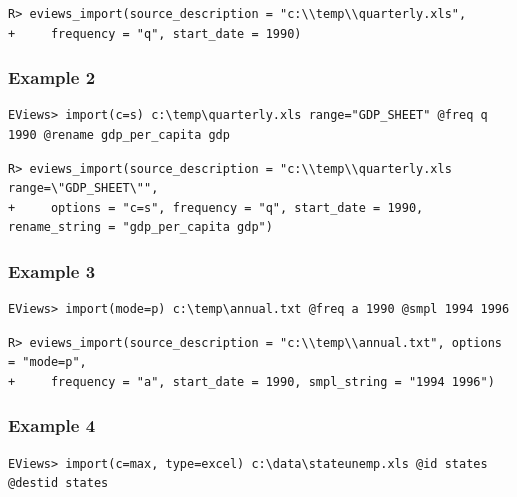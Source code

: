 \begin{verbatim}
R> eviews_import(source_description = "c:\\temp\\quarterly.xls",
+     frequency = "q", start_date = 1990)
\end{verbatim}

\hypertarget{example-2-1}{%
\subsubsection{Example 2}\label{example-2-1}}

\begin{verbatim}
EViews> import(c=s) c:\temp\quarterly.xls range="GDP_SHEET" @freq q 1990 @rename gdp_per_capita gdp
\end{verbatim}

\begin{verbatim}
R> eviews_import(source_description = "c:\\temp\\quarterly.xls range=\"GDP_SHEET\"",
+     options = "c=s", frequency = "q", start_date = 1990, rename_string = "gdp_per_capita gdp")
\end{verbatim}

\hypertarget{example-3-1}{%
\subsubsection{Example 3}\label{example-3-1}}

\begin{verbatim}
EViews> import(mode=p) c:\temp\annual.txt @freq a 1990 @smpl 1994 1996
\end{verbatim}

\begin{verbatim}
R> eviews_import(source_description = "c:\\temp\\annual.txt", options = "mode=p",
+     frequency = "a", start_date = 1990, smpl_string = "1994 1996")
\end{verbatim}

\hypertarget{example-4-1}{%
\subsubsection{Example 4}\label{example-4-1}}

\begin{verbatim}
EViews> import(c=max, type=excel) c:\data\stateunemp.xls @id states @destid states
\end{verbatim}

